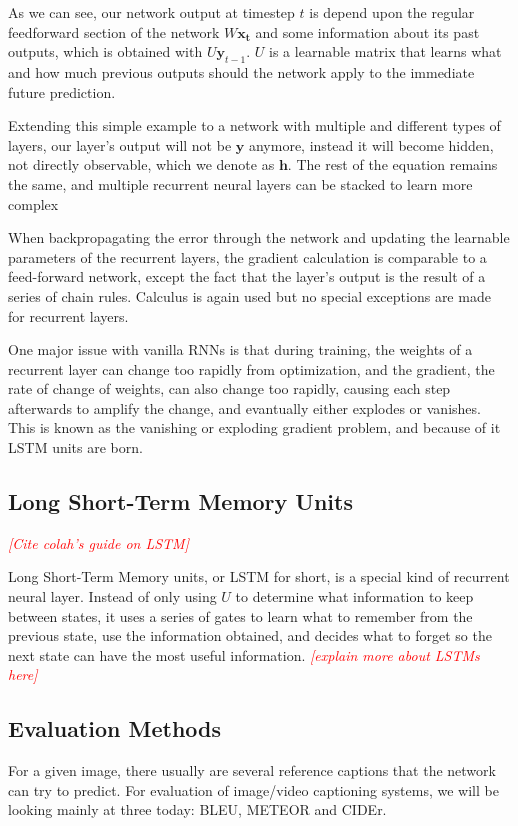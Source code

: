 \documentclass[10pt,twocolumn,letterpaper]{article}
\newcommand{\todo}[1]{\textcolor{red}{{\em [#1]}} }
\newcommand{\matr}[1]{\mathbf{#1}}
\begin{document}
As we can see, our network output at timestep $t$ is depend upon the regular
feedforward section of the network $W \matr{x_{t}}$ and some information about
its past outputs, which is obtained with $U \boldsymbol{y}_{t-1}$. $U$ is a
learnable matrix that learns what and how much previous outputs should the
network apply to the immediate future prediction.

Extending this simple example to a network with multiple and different types
of layers, our layer's output will not be $\boldsymbol{y}$ anymore, instead it
will become hidden, not directly observable, which we denote as
$\boldsymbol{h}$. The rest of the equation remains the same, and multiple
recurrent neural layers can be stacked to learn more complex 

When backpropagating the error through the network and updating the learnable
parameters of the recurrent layers, the gradient calculation is comparable to
a feed-forward network, except the fact that the layer's output is the result
of a series of chain rules. Calculus is again used but no special exceptions
are made for recurrent layers.

One major issue with vanilla RNNs is that during training, the weights of a
recurrent layer can change too rapidly from optimization, and the gradient,
the rate of change of weights, can also change too rapidly, causing each step
afterwards to amplify the change, and evantually either explodes or vanishes.
This is known as the vanishing or exploding gradient problem, and because of
it LSTM units are born.

\subsection{Long Short-Term Memory Units}
\todo{Cite colah's guide on LSTM}

Long Short-Term Memory units, or LSTM for short, is a special kind of
recurrent neural layer. Instead of only using $U$ to determine what
information to keep between states, it uses a series of gates to learn what to
remember from the previous state, use the information obtained, and decides
what to forget so the next state can have the most useful information.
\todo{explain more about LSTMs here}

\subsection{Evaluation Methods}
For a given image, there usually are several reference captions that the
network can try to predict. For evaluation of image/video captioning systems,
we will be looking mainly at three today: BLEU, METEOR and CIDEr.
\end{document}

